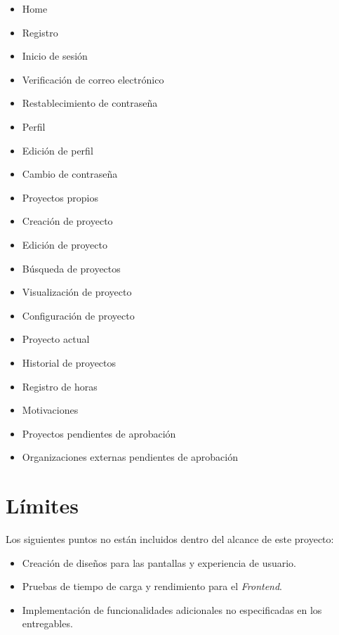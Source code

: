 \begin{itemize}
    \item Home
    \item Registro
    \item Inicio de sesión
    \item Verificación de correo electrónico
    \item Restablecimiento de contraseña
    \item Perfil
    \item Edición de perfil
    \item Cambio de contraseña
    \item Proyectos propios
    \item Creación de proyecto
    \item Edición de proyecto
    \item Búsqueda de proyectos
    \item Visualización de proyecto
    \item Configuración de proyecto
    \item Proyecto actual
    \item Historial de proyectos
    \item Registro de horas
    \item Motivaciones
    \item Proyectos pendientes de aprobación
    \item Organizaciones externas pendientes de aprobación
\end{itemize}

\section{Límites}
Los siguientes puntos no están incluidos dentro del alcance de este proyecto:
\begin{itemize}
    \item Creación de diseños para las pantallas y experiencia de usuario.
    \item Pruebas de tiempo de carga y rendimiento para el \textit{Frontend}.
    \item Implementación de funcionalidades adicionales no especificadas en los entregables.
\end{itemize}
